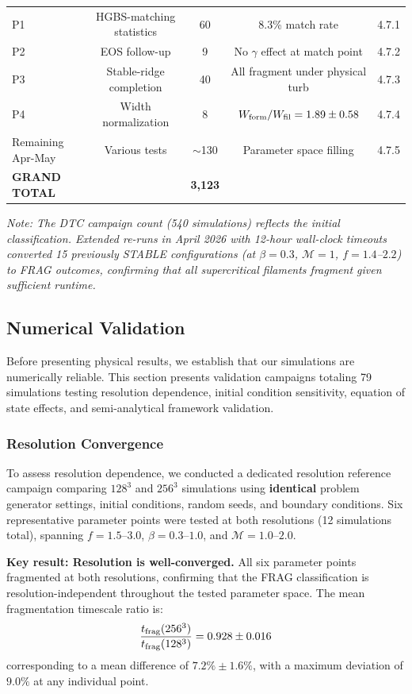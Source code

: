 \documentclass[twocolumn,usenatbib]{mnras}
\begin{document}
\begin{table}
\begin{tabular}{lcccl}
P1 & HGBS-matching statistics & 60 & 8.3\% match rate & 4.7.1 \\
P2 & EOS follow-up & 9 & No $\gamma$ effect at match point & 4.7.2 \\
P3 & Stable-ridge completion & 40 & All fragment under physical turb & 4.7.3 \\
P4 & Width normalization & 8 & $W_{\rm form}/W_{\rm fil}=1.89\pm0.58$ & 4.7.4 \\
Remaining Apr-May & Various tests & $\sim$130 & Parameter space filling & 4.7.5 \\
\midrule
\textbf{GRAND TOTAL} & & \textbf{3,123} &  \\
\bottomrule
\end{tabular}

\vspace{0.1in}
\footnotesize
\textit{Note: The DTC campaign count (540 simulations) reflects the initial classification. Extended re-runs in April 2026 with 12-hour wall-clock timeouts converted 15 previously STABLE configurations (at $\beta = 0.3$, $\mathcal{M} = 1$, $f = 1.4$--$2.2$) to FRAG outcomes, confirming that all supercritical filaments fragment given sufficient runtime.}
\end{table}

\subsection{Numerical Validation}
\label{sec:validation}

Before presenting physical results, we establish that our simulations are numerically reliable. This section presents validation campaigns totaling 79 simulations testing resolution dependence, initial condition sensitivity, equation of state effects, and semi-analytical framework validation.

\subsubsection{Resolution Convergence}

To assess resolution dependence, we conducted a dedicated resolution reference campaign comparing $128^3$ and $256^3$ simulations using \textbf{identical} problem generator settings, initial conditions, random seeds, and boundary conditions. Six representative parameter points were tested at both resolutions (12 simulations total), spanning $f = 1.5$--$3.0$, $\beta = 0.3$--$1.0$, and $\mathcal{M} = 1.0$--$2.0$.

\textbf{Key result: Resolution is well-converged.} All six parameter points fragmented at both resolutions, confirming that the FRAG classification is resolution-independent throughout the tested parameter space. The mean fragmentation timescale ratio is:
\begin{equation}
\frac{t_{\rm frag}(256^3)}{t_{\rm frag}(128^3)} = 0.928 \pm 0.016
\end{equation}
corresponding to a mean difference of $7.2\% \pm 1.6\%$, with a maximum deviation of $9.0\%$ at any individual point.
\end{document}

